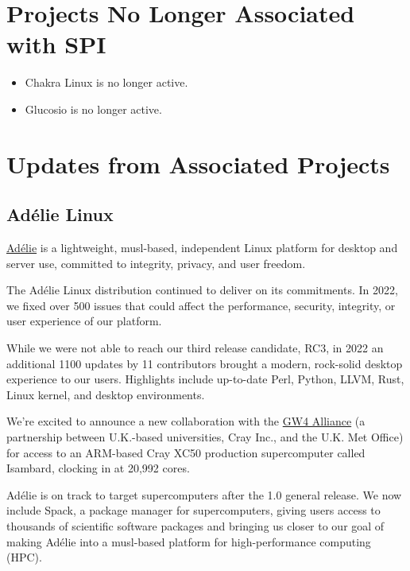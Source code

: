 \documentclass[a4paper]{report}
\begin{document}
\section{Projects No Longer Associated with SPI}

\begin{itemize}

\item Chakra Linux is no longer active.

\item Glucosio is no longer active.

\end{itemize}

\section{Updates from Associated Projects}

\subsection{Adélie Linux}

\href{https://www.adelielinux.org/}{Adélie} is a lightweight, musl-based, independent Linux platform for desktop and server use, committed to integrity, privacy, and user freedom.

The Adélie Linux distribution continued to deliver on its commitments. In 2022, we fixed over 500 issues that could affect the performance, security, integrity, or user experience of our platform.

While we were not able to reach our third release candidate, RC3, in 2022 an additional 1100 updates by 11 contributors brought a modern, rock-solid desktop experience to our users. Highlights include up-to-date Perl, Python, LLVM, Rust, Linux kernel, and desktop environments.

We're excited to announce a new collaboration with the \href{https://gw4.ac.uk/news/new-strategic-partnership-launched-between-gw4-alliance-and-the-western-gateway/}{GW4 Alliance} (a partnership between U.K.-based universities, Cray Inc., and the U.K. Met Office) for access to an ARM-based Cray XC50 production supercomputer called Isambard, clocking in at 20,992 cores.

Adélie is on track to target supercomputers after the 1.0 general release. We now include Spack, a package manager for supercomputers, giving users access to thousands of scientific software packages and bringing us closer to our goal of making Adélie into a musl-based platform for high-performance computing (HPC).
\end{document}
